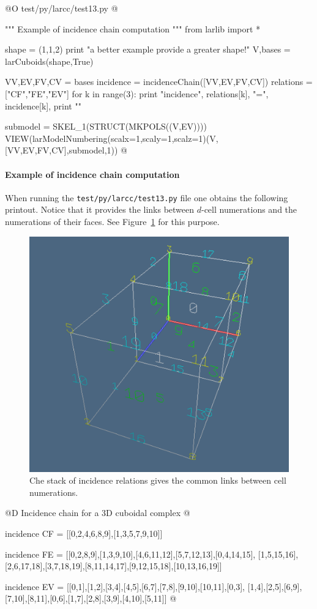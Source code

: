 \documentclass[11pt,oneside]{article}	%
\begin{document}
@O test/py/larcc/test13.py
@{""" Example of incidence chain computation """
from larlib import *

shape = (1,1,2) 
print "\n\nFor a better example provide a greater shape!"
V,bases = larCuboids(shape,True)

VV,EV,FV,CV = bases
incidence = incidenceChain([VV,EV,FV,CV])
relations = ["CF","FE","EV"]
for k in range(3):
	print "\n\n incidence", relations[k], "=\n", incidence[k],
print "\n\n"

submodel = SKEL_1(STRUCT(MKPOLS((V,EV))))
VIEW(larModelNumbering(scalx=1,scaly=1,scalz=1)(V,[VV,EV,FV,CV],submodel,1))
@}


\paragraph{Example of incidence chain computation}
When running the \texttt{test/py/larcc/test13.py} file one obtains the following printout. 
Notice that 
it provides the links between $d$-cell numerations and the numerations of their faces.
See Figure~\ref{incidenceChain} for this purpose.

\begin{figure}[htbp] %
   \centering
   \includegraphics[width=0.5\linewidth]{images/incidenceChain} 
   \caption{Che stack of incidence relations gives the common links between cell numerations.}
   \label{incidenceChain}
\end{figure}


@D Incidence chain for a 3D cuboidal complex
@{incidence CF = [[0,2,4,6,8,9],[1,3,5,7,9,10]]

incidence FE = [[0,2,8,9],[1,3,9,10],[4,6,11,12],[5,7,12,13],[0,4,14,15],
[1,5,15,16],[2,6,17,18],[3,7,18,19],[8,11,14,17],[9,12,15,18],[10,13,16,19]]

incidence EV = [[0,1],[1,2],[3,4],[4,5],[6,7],[7,8],[9,10],[10,11],[0,3],
[1,4],[2,5],[6,9],[7,10],[8,11],[0,6],[1,7],[2,8],[3,9],[4,10],[5,11]]
@}
\end{document}
